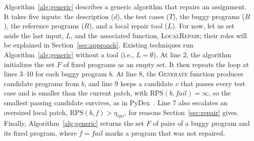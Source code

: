 \documentclass[acmsmall,screen,review,anonymous,nonacm]{acmart}
\newcommand{\Fn}[1]{\textsc{#1}}
\newcommand{\V}[1]{\ensuremath{\mathit{#1}}}
\newcommand{\RPS}{\mathrm{RPS}}
\begin{document}
Algorithm~\ref{alg:generic} describes a generic algorithm that repairs an assignment. It takes five inputs: the description ($d$), the test cases ($T$), the buggy programs ($B$), the reference programs ($R$), and a local repair tool ($L$). For now, let us set aside the last input, $L$, and the associated function, \Fn{LocalRepair}; their roles will be explained in Section~\ref{sec:approach}. Existing techniques run Algorithm~\ref{alg:generic} without a tool (i.e., $L = \emptyset$). At line 2, the algorithm initializes the set $F$ of fixed programs as an empty set. It then repeats the loop at lines 3--10 for each buggy program $b$. At line 8, the \Fn{Generate} function produces candidate programs from $b$, and line 9 keeps a candidate $c$ that passes every test case and is smaller than the current patch, with $\RPS(b, \V{fail}) = \infty$, so the smallest passing candidate survives, as in PyDex~\cite{zhang2024pydex}. Line 7 also escalates an oversized local patch, $\RPS(b, f) > \eta_{\V{rps}}$, for reasons Section~\ref{sec:repair} gives. Finally, Algorithm~\ref{alg:generic} returns the set $F$ of pairs of a buggy program and its fixed program, where $f = \V{fail}$ marks a program that was not repaired.
\end{document}
